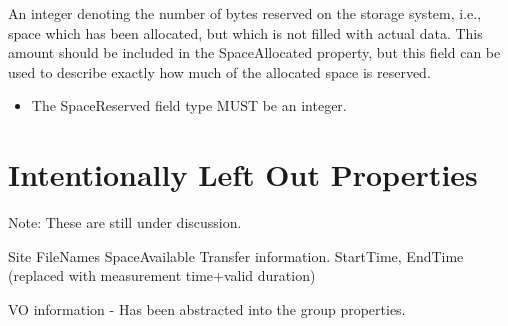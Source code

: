 An integer denoting the number of bytes reserved on the storage system, i.e.,
space which has been allocated, but which is not filled with actual data. This
amount should be included in the SpaceAllocated property, but this field can be
used to describe exactly how much of the allocated space is reserved.

\begin{itemize}
\item The SpaceReserved field type MUST be an integer.
\end{itemize}







\section{Intentionally Left Out Properties}

Note: These are still under discussion.

Site
FileNames
SpaceAvailable
Transfer information.
StartTime, EndTime (replaced with measurement time+valid duration)

VO information - Has been abstracted into the group properties.


